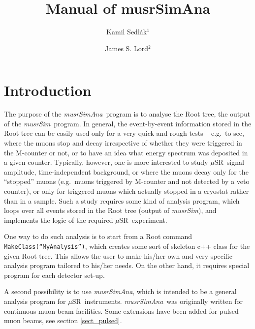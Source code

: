 \documentclass[twoside]{dis04}
\begin{document}
\newcommand{\musr}{\ensuremath{\mu}SR}
\newcommand{\musrSim}{\emph{musrSim}}
\newcommand{\musrSimAna}{\emph{musrSimAna}}
\title{Manual of musrSimAna}
\author{Kamil Sedl\'ak$^1$}
\author{James S. Lord$^2$}

\address{{$^1$ Laboratory for Muon Spin Spectroscopy, Paul Scherrer Institut, CH-5232 Villigen PSI, Switzerland}}
\address{{$^2$ ISIS Facility, Rutherford Appleton Laboratory, Chilton, Oxon OX11 0QX, U.K.}}

\maketitle


\section{Introduction}
\label{introduction}
The purpose of the \musrSimAna\ program is to analyse the Root tree, the output 
of the \musrSim\ program.
In general, the event-by-event information stored in the Root tree can be easily used only for
a very quick and rough tests -- e.g.\ to see, where the muons stop and decay irrespective
of whether they were triggered in the M-counter or not, or to have an idea what energy
spectrum was deposited in a given counter.  Typically, however, one is more interested
to study \musr\ signal amplitude, time-independent background, or where the muons decay
only for the ``stopped'' muons (e.g.\ muons triggered by M-counter and not detected
by a veto counter), or only for triggered muons which actually stopped in a cryostat
rather than in a sample.  Such a study requires some kind of analysis program, which
loops over all events stored in the Root tree (output of \musrSim), and implements the
logic of the required \musr\ experiment.

One way to do such analysis is to start from a Root command {\tt MakeClass(``MyAnalysis'')},
which creates some sort of skeleton c++ class for the given Root tree.  This allows the user
to make his/her own and very specific analysis program tailored to his/her needs.  On the other
hand, it requires special program for each detector set-up.

A second possibility is to use \musrSimAna, which is intended to be a general analysis 
program for \musr\ instruments. 
\musrSimAna\ was originally written for continuous muon beam facilities.
Some extensions have been added for pulsed muon beams, see section \ref{sect_pulsed}.
\end{document}
